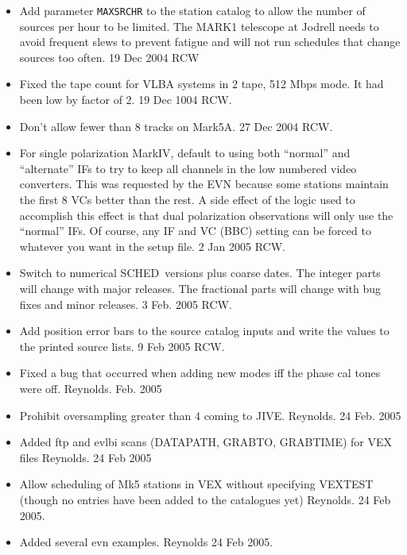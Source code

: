 \documentclass{report}
\newcommand{\schedb}{{\sc SCHED~}}
\begin{document}
\begin{itemize}
\item Add parameter {\tt MAXSRCHR} to the station catalog to allow the
number of sources per hour to be limited.  The MARK1 telescope at Jodrell
needs to avoid frequent slews to prevent fatigue and will not run
schedules that change sources too often.  19 Dec 2004  RCW

\item Fixed the tape count for VLBA systems in 2 tape, 512 Mbps mode.
It had been low by factor of 2.  19 Dec 1004  RCW.

\item Don't allow fewer than 8 tracks on Mark5A.  27 Dec 2004  RCW.

\item For single polarization MarkIV, default to using both ``normal''
and ``alternate'' IFs to try to keep all channels in the low numbered
video converters.  This was requested by the EVN because some stations
maintain the first 8 VCs better than the rest.  A side effect of the
logic used to accomplish this effect is that dual polarization observations
will only use the ``normal'' IFs.  Of course, any IF and VC (BBC) setting
can be forced to whatever you want in the setup file.  2 Jan 2005  RCW.

\item Switch to numerical \schedb versions plus coarse dates.  The integer
parts will change with major releases.  The fractional parts will change
with bug fixes and minor releases.  3 Feb. 2005  RCW.

\item Add position error bars to the source catalog inputs and write
the values to the printed source lists.  9 Feb 2005  RCW.

\item Fixed a bug that occurred when adding new modes iff the phase
cal tones were off.  Reynolds.  Feb. 2005

\item Prohibit oversampling greater than 4 coming to JIVE.  Reynolds.
24 Feb. 2005

\item Added ftp and evlbi scans (DATAPATH, GRABTO, GRABTIME) for VEX files
Reynolds. 24 Feb 2005

\item Allow scheduling of Mk5 stations in VEX without specifying
VEXTEST (though no entries have been added to the catalogues yet)
Reynolds.  24 Feb 2005.

\item Added several evn examples.  Reynolds 24 Feb 2005.

\end{itemize}
\end{document}
